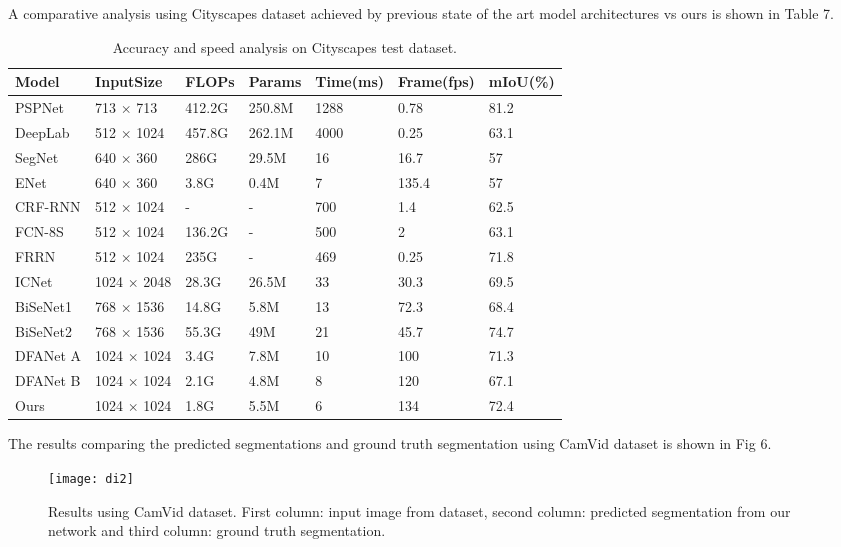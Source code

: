 \documentclass{article}
\begin{document}
A comparative analysis using Cityscapes dataset achieved by previous state of the art model architectures vs ours is shown in Table 7.

\begin{table}[h]
  \caption{Accuracy and speed analysis on Cityscapes test dataset.}
  \label{sample-table6}
  \centering
  \begin{tabular}{lllllll}
  \toprule
Model &InputSize &FLOPs &Params &Time(ms) &Frame(fps) &mIoU(\%)\\
   \midrule
PSPNet \citep{zhao2017pyramid} &713 $\times$ 713 &412.2G &250.8M &1288 &0.78 &81.2\\
DeepLab \citep{chen2017deeplab} &512 $\times$ 1024 &457.8G &262.1M &4000 &0.25 &63.1\\
SegNet \citep{badrinarayanan2017segnet} &640 $\times$ 360 &286G &29.5M &16 &16.7 &57\\
ENet \citep{paszke2016enet} &640 $\times$ 360 &3.8G &0.4M &7 &135.4 &57\\
CRF-RNN \citep{zheng2015conditional} &512 $\times$ 1024 &- &- &700 &1.4 &62.5\\
FCN-8S \citep{long2015fully} &512 $\times$ 1024 &136.2G &- &500 &2 &63.1\\
FRRN \citep{pohlen2017full} &512 $\times$ 1024 &235G &- &469 &0.25 &71.8\\
ICNet \citep{zhao2018icnet} &1024 $\times$ 2048 &28.3G &26.5M &33 &30.3 &69.5\\
BiSeNet1 \citep{yu2018bisenet} &768 $\times$ 1536 &14.8G &5.8M &13 &72.3 &68.4\\
BiSeNet2 \citep{yu2018bisenet} &768 $\times$ 1536 &55.3G &49M &21 &45.7 &74.7\\
DFANet A \citep{li2019dfanet} &1024 $\times$ 1024 &3.4G &7.8M &10 &100 &71.3\\
DFANet B \citep{li2019dfanet} &1024 $\times$ 1024 &2.1G &4.8M &8 &120 &67.1\\
Ours &1024 $\times$ 1024 &1.8G &5.5M &6 &134 &72.4\\
    \bottomrule
  \end{tabular}
\end{table}

The results comparing the predicted segmentations and ground truth segmentation using CamVid dataset is shown in Fig 6.

\begin{figure}[htp]
    \centering
    \texttt{[image: di2]}
    \caption{Results using CamVid dataset. First column: input image from dataset, second column: predicted segmentation from our network and third column: ground truth segmentation.}
    \label{fig5}
\end{figure}
\end{document}
